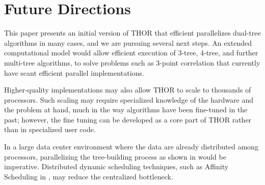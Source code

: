 \documentclass[twoside,leqno,twocolumn]{article}
\newcommand{\authornote}[1]{(\footnote{Note to self: #1})}
\newcommand{\authorsnote}[1]{\authornote{#1}}
\newcommand{\fig}[1]{Figure~\ref{fig:#1}}
\begin{document}




\section{Future Directions}

This paper presents an initial version of THOR that efficient parallelizes dual-tree algorithms in many cases, and we are pursuing several next steps.
An extended computational model would allow efficient execution of 3-tree, 4-tree, and further multi-tree algorithms, to solve problems such as 3-point correlation that currently have scant efficient parallel implementations.

Higher-quality implementations may also allow THOR to scale to thousands of processors.
Such scaling may require specialized knowledge of the hardware and the problem at hand, much in the way algorithms have been fine-tuned in the past; however, the fine tuning can be developed as a core part of THOR rather than in specialized user code.

In a large data center environment where the data are already distributed among processors, parallelizing the tree-building process as shown in \cite{alfuraih00parallel} would be imperative.
Distributed dynamic scheduling techniques, such as Affinity Scheduling in \cite{markatos92using}, may reduce the centralized bottleneck.
\end{document}
